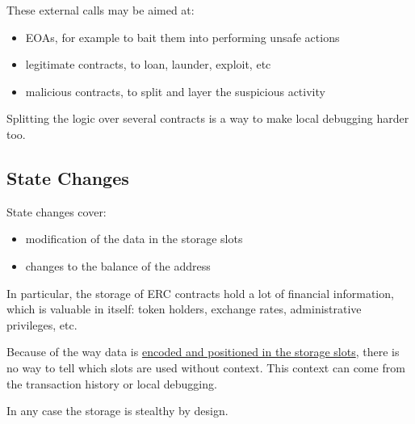 These external calls may be aimed at:

\begin{itemize}
\item{EOAs, for example to bait them into performing unsafe actions}
\item{legitimate contracts, to loan, launder, exploit, etc}
\item{malicious contracts, to split and layer the suspicious activity}
\end{itemize}

Splitting the logic over several contracts is a way to make local debugging harder too.

\subsection{State Changes}

State changes cover:

\begin{itemize}
\item{modification of the data in the storage slots}
\item{changes to the balance of the address}
\end{itemize}

In particular, the storage of ERC contracts hold a lot of financial information, which is valuable in itself:
token holders, exchange rates, administrative privileges, etc.

Because of the way data is \href{\urldocsstoragelayout}{encoded and positioned in the storage slots}, there is no way to tell which slots are used without context.
This context can come from the transaction history or local debugging.

In any case the storage is stealthy by design.
